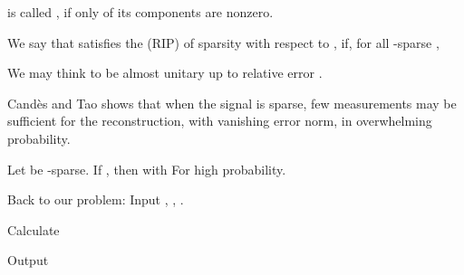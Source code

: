 {
\I {} is called , if only  of its components are nonzero.

\I We say that  satisfies the  (RIP) of sparsity  with respect to , if, for all -sparse ,

\I We may think  to be almost unitary up to relative error .
}
{
\I Candès and Tao shows that when the signal is sparse, few measurements may be sufficient for the reconstruction, with vanishing error norm, in overwhelming probability.

\I Let  be -sparse.
If , then
with
For high probability.
}
{
\I Back to our problem: Input , , .

\I Calculate

\I Output 
}

